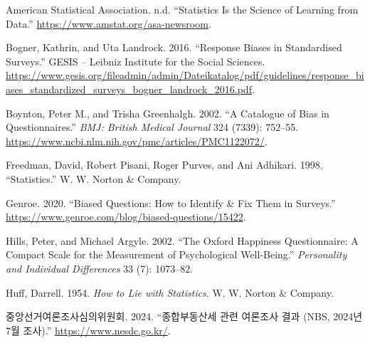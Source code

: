 \documentclass[
]{book}
\newlength{\cslhangindent}
\newenvironment{CSLReferences}[2] %
 {\begin{list}{}{%
  \setlength{\itemindent}{0pt}
  \setlength{\leftmargin}{0pt}
  \setlength{\parsep}{0pt}
  \ifodd #1
   \setlength{\leftmargin}{\cslhangindent}
   \setlength{\itemindent}{-1\cslhangindent}
  \fi
  \setlength{\itemsep}{#2\baselineskip}}}
 {\end{list}}
\begin{document}
\label{refs}
\begin{CSLReferences}{1}{0}
American Statistical Association. n.d. {``Statistics Is the Science of Learning from Data.''} \url{https://www.amstat.org/asa-newsroom}.

Bogner, Kathrin, and Uta Landrock. 2016. {``Response Biases in Standardised Surveys.''} GESIS -- Leibniz Institute for the Social Sciences. \url{https://www.gesis.org/fileadmin/admin/Dateikatalog/pdf/guidelines/response_biases_standardized_surveys_bogner_landrock_2016.pdf}.

Boynton, Peter M., and Trisha Greenhalgh. 2002. {``A Catalogue of Bias in Questionnaires.''} \emph{BMJ: British Medical Journal} 324 (7339): 752--55. \url{https://www.ncbi.nlm.nih.gov/pmc/articles/PMC1122072/}.

Freedman, David, Robert Pisani, Roger Purves, and Ani Adhikari. 1998. {``Statistics.''} W. W. Norton \& Company.

Genroe. 2020. {``Biased Questions: How to Identify \& Fix Them in Surveys.''} \url{https://www.genroe.com/blog/biased-questions/15422}.

Hills, Peter, and Michael Argyle. 2002. {``The Oxford Happiness Questionnaire: A Compact Scale for the Measurement of Psychological Well-Being.''} \emph{Personality and Individual Differences} 33 (7): 1073--82.

Huff, Darrell. 1954. \emph{How to Lie with Statistics}. W. W. Norton \& Company.

중앙선거여론조사심의위원회. 2024. {``종합부동산세 관련 여론조사 결과 (NBS, 2024년 7월 조사).''} \url{https://www.nesdc.go.kr/}.

\end{CSLReferences}
\end{document}
